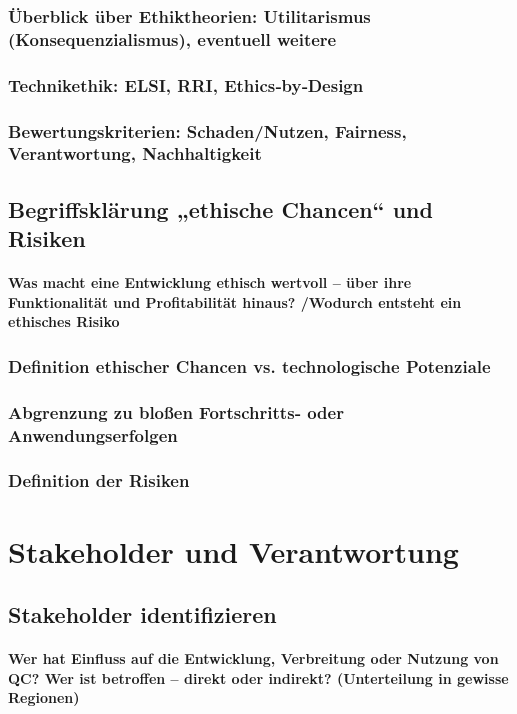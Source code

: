 {\subsubsection{Überblick über Ethiktheorien: Utilitarismus (Konsequenzialismus), eventuell weitere}
\subsubsection{Technikethik: ELSI, RRI, Ethics‑by‑Design}
\subsubsection{Bewertungskriterien: Schaden/Nutzen, Fairness, Verantwortung, Nachhaltigkeit}


\subsection{Begriffsklärung „ethische Chancen“ und Risiken}
\paragraph{Was macht eine Entwicklung ethisch wertvoll – über ihre Funktionalität und Profitabilität hinaus? /Wodurch entsteht ein ethisches Risiko}

\subsubsection{Definition ethischer Chancen vs. technologische Potenziale}
\subsubsection{Abgrenzung zu bloßen Fortschritts‑ oder Anwendungserfolgen}
\subsubsection{Definition der Risiken}



\section{Stakeholder und Verantwortung}

\subsection{Stakeholder identifizieren}
\paragraph{Wer hat Einfluss auf die Entwicklung, Verbreitung oder Nutzung von QC? 
Wer ist betroffen – direkt oder indirekt?
(Unterteilung in gewisse Regionen)}

}
